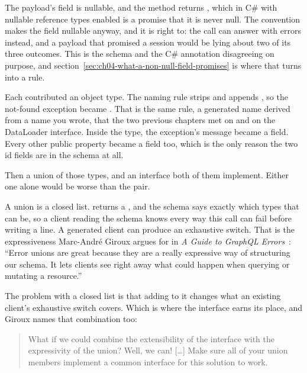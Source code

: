 %
The payload's  field is nullable, and the method returns
, which in C\# with nullable reference types enabled is a
promise that it is never null. The convention makes the field nullable anyway,
and it is right to: the call can answer with errors instead, and a payload
that promised a session would be lying about two of its three outcomes. This
is the schema and the C\# annotation disagreeing on purpose, and
section~\ref{sec:ch04-what-a-non-null-field-promises} is where that turns into
a rule.

%
Each \code{[Error<T>]} contributed an object type. The naming rule strips
 and appends , so the not-found exception became
. That is the same rule, a generated name derived
from a name you wrote, that the two previous chapters met on
 and on the DataLoader interface. Inside the type, the
exception's message became a
 field. Every other public property became a field too, which is
the only reason the two id fields are in the schema at all.

%
%
Then a union of those types, and an interface both of them implement. Either
one alone would be worse than the pair.

A union is a closed list.  returns a
, and the schema says exactly which types that can
be, so a client reading the schema knows every way this call can fail before
writing a line. A generated client can produce an exhaustive switch. That is
the expressiveness Marc-Andr\'{e} Giroux argues for in \emph{A Guide to GraphQL
Errors}~\autocite{giroux2020}: \enquote{Error unions are great because they are
a really expressive way of structuring our schema. It lets clients see right
away what could happen when querying or mutating a resource.}

The problem with a closed list is that adding to it changes what an existing
client's exhaustive switch covers. Which is where the interface earns its
place, and Giroux names that combination too:

\begin{quote}
What if we could combine the extensibility of the interface with the
expressivity of the union? Well, we can! [\ldots] Make sure all of your union
members implement a common interface for this solution to work.
\end{quote}

